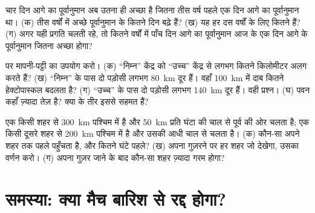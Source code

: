 \begin{exercise}[$\star\star$]\label{exo:g8:fronts-and-weather-maps:10}
चार दिन आगे का पूर्वानुमान अब उतना ही अच्छा है जितना तीस वर्ष पहले एक दिन आगे का
पूर्वानुमान था। (क) तीस वर्षों में अच्छे पूर्वानुमान के कितने दिन बढ़े हैं? (ख) यह हर
दस वर्षों के लिए कितने हैं? (ग) अगर यही प्रगति चलती रहे, तो कितने वर्षों में पाँच दिन
आगे का पूर्वानुमान आज के एक दिन आगे के पूर्वानुमान जितना अच्छा
होगा?
\end{exercise}

\begin{exercise}[$\star\star\star$]\label{exo:g8:fronts-and-weather-maps:11}
  पर मापनी-पट्टी का उपयोग करो। (क) ``निम्न'' केंद्र को ``उच्च'' केंद्र से
लगभग कितने किलोमीटर अलग करते हैं? (ख) ``निम्न'' के पास दो पड़ोसी  लगभग
\qty{80}{km} दूर हैं। वहाँ \qty{100}{km} में दाब कितने हेक्टोपास्कल बदलता है?
(ग) ``उच्च'' के पास दो पड़ोसी  लगभग \qty{140}{km} दूर हैं। वही प्रश्न।
(घ) पवन कहाँ ज़्यादा तेज़ है? क्या  के तीर इससे सहमत हैं?
\end{exercise}

\begin{exercise}[$\star\star\star$]\label{exo:g8:fronts-and-weather-maps:12}
एक  किसी शहर से \qty{300}{km} पश्चिम में है और
\qty{50}{km} प्रति घंटा की चाल से पूर्व की ओर चलता है; एक  किसी दूसरे शहर
से \qty{200}{km} पश्चिम में है और उसकी आधी चाल से चलता है। (क) कौन-सा  अपने
शहर तक पहले पहुँचता है, और कितने घंटे पहले? (ख) अपना  गुज़रने पर हर शहर जो
 देखेगा, उसका वर्णन करो। (ग) अपना  गुज़र जाने के बाद कौन-सा शहर ज़्यादा
गरम होगा?
\end{exercise}

\section{समस्या: क्या मैच बारिश से रद्द होगा?}

